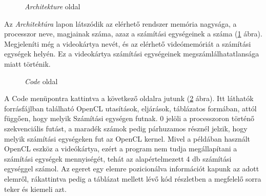 \begin{figure}[h]
\centering
{}
\caption{\textit{Architekture} oldal}
\label{fig:arch}
\end{figure}


Az \textit{Architektúra} lapon látszódik az elérhető rendszer memória nagysága, a processzor neve, magjainak száma, azaz a számítási egységeinek a száma (\ref{fig:arch} ábra). Megjeleníti még a videokártya nevét, és az elérhető videómemóriát a számítási egységek helyén. Ez a videokártya számítási egységeinek megszámlálhatatlansága miatt történik.

\begin{figure}[h]
\centering
{}
\caption{\textit{Code} oldal}
\label{fig:code}
\end{figure}

\newpage
A Code menüpontra kattintva a következő oldalra jutunk (\ref{fig:code} ábra). Itt láthatók forrásfájlban található OpenCL utasítások, eljárások, táblázatos formában, attól függően, hogy melyik Számítási egységen futnak. 0 jelöli a processzoron történő szekvenciális futást, a maradék számok pedig párhuzamos résznél jelzik, hogy melyik számítási egységeken fut az OpenCL kernel. Mivel a példában használt OpenCL eszköz a videókártya, ezért a program nem tudja megállapítani a számítási egységek mennyiségét, tehát az alapértelmezett 4 db számítási egységgel számol. Az egeret egy elemre pozicionálva információt kapunk az adott elemről, rákattintva pedig a táblázat mellett lévő kód részletben a megfelelő sorra teker és kiemeli azt.

